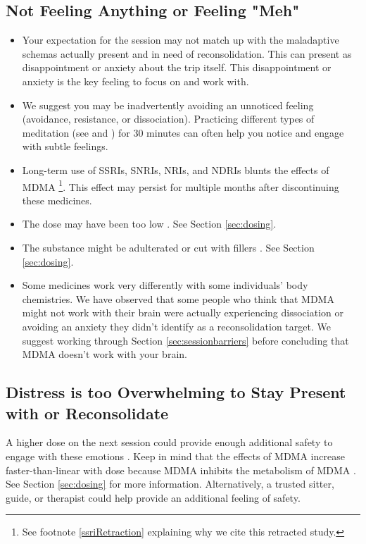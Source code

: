 \documentclass[12pt,letterpaper]{book}
\begin{document}
\subsection*{Not Feeling Anything or Feeling "Meh"}
\begin{itemize}
    \item Your expectation for the session may not match up with the maladaptive schemas actually present and in need of reconsolidation. This can present as disappointment or anxiety about the trip itself. This disappointment or anxiety is the key feeling to focus on and work with.
    \item We suggest you may be inadvertently avoiding an unnoticed feeling (avoidance, resistance, or dissociation). Practicing different types of meditation (see \textcite{rain} and \textcite{bodyscan}) for 30 minutes can often help you notice and engage with subtle feelings.
    \item Long-term use of SSRIs, SNRIs, NRIs, and NDRIs blunts the effects of MDMA \cite{feducciaSSRIDiscontinuation}\footnote{See footnote \ref{ssriRetraction} explaining why we cite this retracted study.}. This effect may persist for multiple months after discontinuing these medicines.
    \item The dose may have been too low \cite{bediMDMALowDose}. See Section \ref{sec:dosing}.
    \item The substance might be adulterated or cut with fillers \cite{saleemiAdulterants}. See Section \ref{sec:dosing}.
    \item Some medicines work very differently with some individuals' body chemistries. We have observed that some people who think that MDMA might not work with their brain were actually experiencing dissociation or avoiding an anxiety they didn't identify as a reconsolidation target. We suggest working through Section \ref{sec:sessionbarriers} before concluding that MDMA doesn't work with your brain. 
\end{itemize}
\subsection*{Distress is too Overwhelming to Stay Present with or Reconsolidate}
A higher dose on the next session could provide enough additional safety to engage with these emotions \cite{regan2021Connection}. Keep in mind that the effects of MDMA increase faster-than-linear with dose because MDMA inhibits the metabolism of MDMA \cite{de2000nonlinear}. See Section \ref{sec:dosing} for more information. Alternatively, a trusted sitter, guide, or therapist could help provide an additional feeling of safety.
\end{document}
